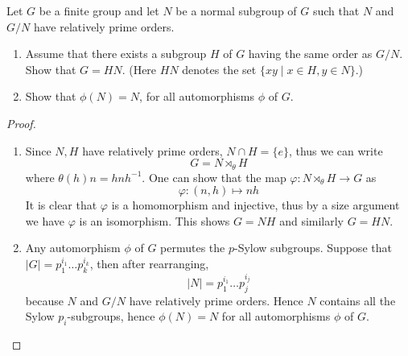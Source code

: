 \begin{prob}[F2001-Q1]
    Let \( G \) be a finite group and let \( N \) be a normal subgroup of \( G \) such that \( N \) and \( G/N \) have relatively prime orders.
        
        \begin{enumerate}
            \item Assume that there exists a subgroup \( H \) of \( G \) having the same order as \( G/N \). Show that \( G = HN \). (Here \( HN \) denotes the set \(\{xy \mid x \in H, y \in N\}\).)
            
            \item Show that \( \phi(N) = N \), for all automorphisms \( \phi \) of \( G \).
        \end{enumerate}
\end{prob}
\begin{proof}
    \begin{enumerate}
        \item Since $N,H$ have relatively prime orders, $N\cap H=\{e\}$, thus we can write 
        \begin{equation*}
            G=N\rtimes_\theta H
        \end{equation*}
        where $\theta(h)n=hnh^{-1}$. One can show that the map $\varphi: N\rtimes_\theta H\to G$ as
        \begin{equation*}
            \varphi:(n,h)\mapsto nh
        \end{equation*}
        It is clear that $\varphi$ is a homomorphism and injective, thus by a size argument we have $\varphi$ is an isomorphism. This shows $G=NH$ and similarly $G=HN$.
        \item Any automorphism $\phi$ of $G$ permutes the $p$-Sylow subgroups. Suppose that $|G|=p_1^{i_1}\dots p_k^{i_k}$, then after rearranging,
        \begin{equation*}
            |N|=p_1^{i_1}\dots p_j^{i_j}
        \end{equation*}
        because $N$ and $G/N$ have relatively prime orders. Hence $N$ contains all the Sylow $p_i$-subgroups, hence $\phi(N)=N$ for all automorphisms $\phi$ of $G$.
    \end{enumerate}
\end{proof}


